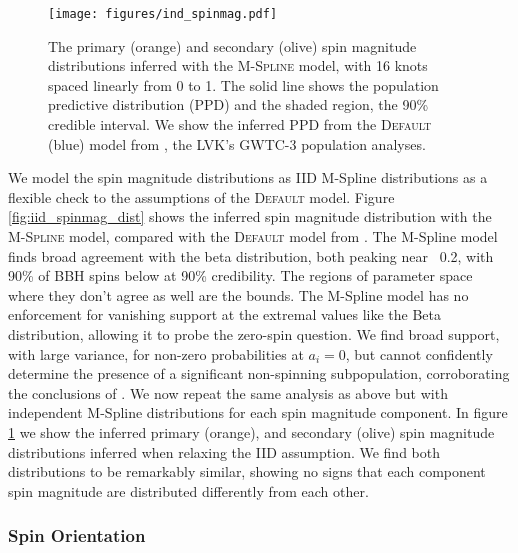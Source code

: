 \begin{figure} 
    \begin{centering}
        \texttt{[image: figures/ind\_spinmag.pdf]}
        \caption{The primary (orange) and secondary (olive) spin magnitude distributions inferred with the \textsc{M-Spline} model, 
        with 16 knots spaced linearly from 0 to 1. The solid line shows the population predictive distribution (PPD) and the shaded region, the 90\% credible interval. 
        We show the inferred PPD from the \textsc{Default} (blue) model from \citet{o3b_astro_dist}, the LVK's GWTC-3 population analyses.}
        \label{fig:ind_spinmag_dist}
    \end{centering}
\end{figure}

We model the spin magnitude distributions as IID M-Spline distributions as a flexible check
to the assumptions of the \textsc{Default} model. Figure \ref{fig:iid_spinmag_dist} shows the inferred spin magnitude distribution with the \textsc{M-Spline} model, 
compared with the \textsc{Default} model from \citet{o3b_astro_dist}. The M-Spline model finds broad agreement with the beta distribution, both peaking near ~0.2, with 90\% 
of BBH spins below \result{$\CIPlusMinus{\macros[MSplineIIDCompSpins][a_90percentile]}$} at 90\% credibility. The regions of parameter space where they don't agree as well are the bounds. 
The M-Spline model has no enforcement for vanishing support at the extremal values like the Beta distribution, 
allowing it to probe the zero-spin question. We find broad support, with large variance, for non-zero probabilities at $a_i=0$, but cannot confidently determine the presence of 
a significant non-spinning subpopulation, corroborating the conclusions of \citet{BuildBetterSpinModels,Callister_NoEvidence,GWTC3MonashSpin}. 
We now repeat the same analysis as above but with independent M-Spline distributions for each spin magnitude component. In figure \ref{fig:ind_spinmag_dist} 
we show the inferred primary (orange), and secondary (olive) spin magnitude distributions inferred when relaxing the IID assumption. We find both 
distributions to be remarkably similar, showing no signs that each component spin magnitude are distributed differently from each other.

\subsubsection{Spin Orientation}

